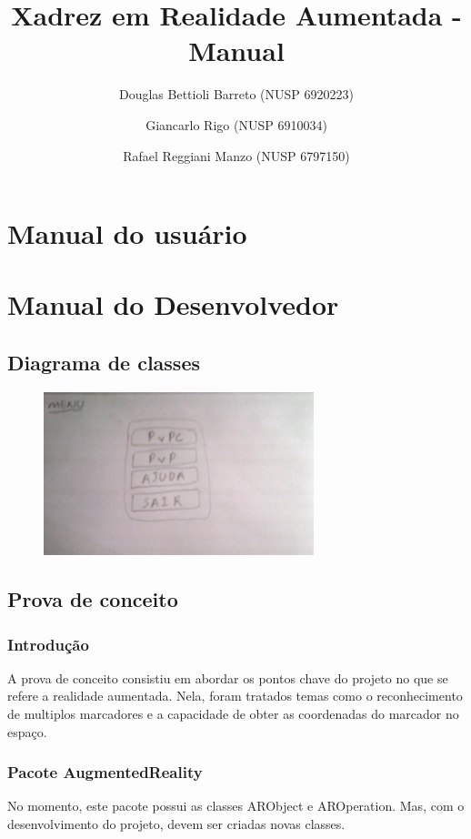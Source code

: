 \documentclass[a4paper,12pt]{book}
\title{Xadrez em Realidade Aumentada - Manual}
\author{
		Douglas Bettioli Barreto (NUSP 6920223)
		\and Giancarlo Rigo (NUSP 6910034)
		\and Rafael Reggiani Manzo (NUSP 6797150)
	   }
\begin{document}
\maketitle

\part{Manual do usu\'ario}
\label{part:manualdousuario}

\part{Manual do Desenvolvedor}
\label{part:manualdodesenvolvedor}
	\chapter{Diagrama de classes}
	\label{ch:diagramadeclasses}
	\begin{figure}[h]
	\centering
	\includegraphics[width=0.7\textwidth]{menu}
	\end{figure}
	
	\chapter{Prova de conceito}
	\label{ch:provadeconceito}
		\section{Introdu\c c\~ao}
		\label{sec:pcintroducao}
		A prova de conceito consistiu em abordar os pontos chave do projeto no que se
		refere a realidade aumentada. Nela, foram tratados temas como o reconhecimento
		de multiplos marcadores e a capacidade de obter as coordenadas do marcador no
		espa\c co.
		
		\section{Pacote AugmentedReality}
		\label{sec:pcpacoteaugmentedreality}
		
		No momento, este pacote possui as classes ARObject e AROperation. Mas, com o
		desenvolvimento do projeto, devem ser criadas novas classes.

		
\end{document}
